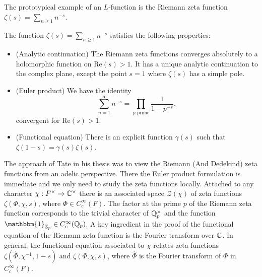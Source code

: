 The prototypical example of an $L$-function is the Riemann zeta function $\zeta(s) = \sum_{n \geq 1} n^{-s}$.

\begin{prop}
    The function $\zeta(s) = \sum_{n \geq 1} n^{-s}$ satisfies the following properties:
    \begin{itemize}
        \item (Analytic continuation) The Riemann zeta functions converges absolutely to a holomorphic function on $\mathrm{Re}(s)>1$. It has a unique analytic continuation to the complex plane, except the point $s=1$ where $\zeta(s)$ has a simple pole.
        \item (Euler product) We have the identity $$\sum\limits_{n=1}^\infty n^{-s} = \prod\limits_{p \text{ prime}} \frac{1}{1-p^{-s}},$$ convergent for $\mathrm{Re}(s)>1$.
        \item (Functional equation) There is an explicit function $\gamma(s)$ such that $\zeta(1-s)=\gamma(s)\zeta(s)$.
    \end{itemize}
\end{prop}

The approach of Tate in his thesis was to view the Riemann (And Dedekind) zeta functions from an adelic perspective. There the Euler product formulation is immediate and we only need to study the zeta functions locally. Attached to any character $\chi:F^\times \to \mathbb{C}^\times$ there is an associated space $\mathcal Z(\chi)$ of zeta functions $\zeta(\Phi,\chi,s)$, where $\Phi \in C_c^\infty(F)$. The factor at the prime $p$ of the Riemann zeta function corresponds to the trivial character of $\mathbb{Q}_p^\times$ and the function $\mathbbm{1}_{\ZZ_p} \in C_c^\infty(\QQ_p)$. A key ingredient in the proof of the functional equation of the Riemann zeta function is the Fourier transform over $\mathbb{C}$. In general, the functional equation associated to $\chi$ relates zeta functions $\zeta(\hat{\Phi},\chi^{-1},1-s)$ and $\zeta(\Phi,\chi,s)$, where $\hat{\Phi}$ is the Fourier transform of $\Phi$ in $C_c^\infty(F)$. 
